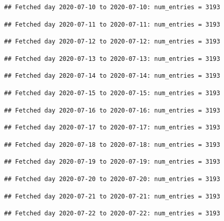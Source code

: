 \documentclass[]{article}
\begin{document}
\begin{verbatim}
## Fetched day 2020-07-10 to 2020-07-10: num_entries = 3193
\end{verbatim}

\begin{verbatim}
## Fetched day 2020-07-11 to 2020-07-11: num_entries = 3193
\end{verbatim}

\begin{verbatim}
## Fetched day 2020-07-12 to 2020-07-12: num_entries = 3193
\end{verbatim}

\begin{verbatim}
## Fetched day 2020-07-13 to 2020-07-13: num_entries = 3193
\end{verbatim}

\begin{verbatim}
## Fetched day 2020-07-14 to 2020-07-14: num_entries = 3193
\end{verbatim}

\begin{verbatim}
## Fetched day 2020-07-15 to 2020-07-15: num_entries = 3193
\end{verbatim}

\begin{verbatim}
## Fetched day 2020-07-16 to 2020-07-16: num_entries = 3193
\end{verbatim}

\begin{verbatim}
## Fetched day 2020-07-17 to 2020-07-17: num_entries = 3193
\end{verbatim}

\begin{verbatim}
## Fetched day 2020-07-18 to 2020-07-18: num_entries = 3193
\end{verbatim}

\begin{verbatim}
## Fetched day 2020-07-19 to 2020-07-19: num_entries = 3193
\end{verbatim}

\begin{verbatim}
## Fetched day 2020-07-20 to 2020-07-20: num_entries = 3193
\end{verbatim}

\begin{verbatim}
## Fetched day 2020-07-21 to 2020-07-21: num_entries = 3193
\end{verbatim}

\begin{verbatim}
## Fetched day 2020-07-22 to 2020-07-22: num_entries = 3193
\end{verbatim}
\end{document}
